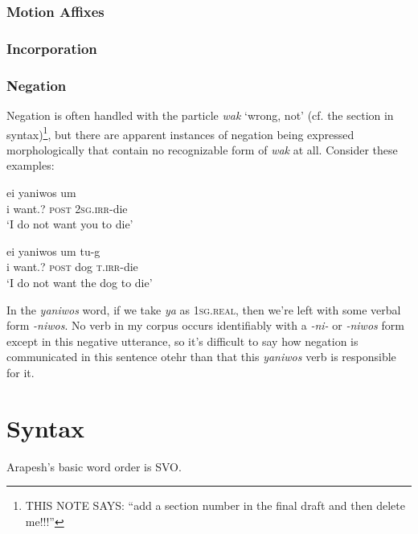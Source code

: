 \documentclass[pdftex,12pt,letterpaper]{article}
\let\ipa\textipa
\begin{document}
\subsubsection{Motion Affixes}

\subsubsection{Incorporation}

\subsubsection{Negation}

Negation is often handled with the particle \emph{wak} `wrong, not' (cf. the section in syntax)\footnote{THIS NOTE SAYS: ``add a section number in the final draft and then delete me!!!''}, but there are apparent instances of negation being expressed morphologically that contain no recognizable form of \emph{wak} at all. Consider these examples:

\begin{exe}
 \ex
 \gll ei yaniwos um \ipa{\textltailn@} \ipa{\textltailn u-g@k} \\
 i want.? \textsc{post} \textsc{2sg.irr}-die \\
 \trans `I do not want you to die'
 
 \ex
 \gll ei yaniwos um \ipa{n1mbat} tu-g\ipa{@k} \\
 i want.? \textsc{post} dog \textsc{t.irr}-die \\
 \trans `I do not want the dog to die'
\end{exe}

In the \emph{yaniwos} word, if we take \emph{ya} as \textsc{1sg.real}, then we're left with some verbal form \emph{-niwos}. No verb in my corpus occurs identifiably with a \emph{-ni-} or \emph{-niwos} form except in this negative utterance, so it's difficult to say how negation is communicated in this sentence otehr than that this \emph{yaniwos} verb is responsible for it.



 \pagebreak
 \section{Syntax}

 Arapesh's basic word order is SVO.
\end{document}
